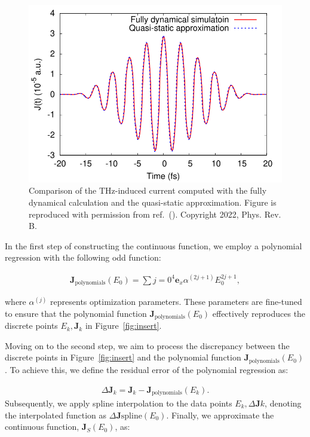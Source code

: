 \begin{figure}[htbp]
	\centering
	\includegraphics[width=0.8\linewidth]{pic/current_comparison_appendix.pdf}
	\caption{\label{fig:current} Comparison of the THz-induced current computed with the fully dynamical calculation and the quasi-static approximation. Figure is reproduced with permission from ref.~(\cite{PhysRevB.106.024313}). Copyright 2022, Phys. Rev. B.}
\end{figure}

In the first step of constructing the continuous function, we employ a polynomial regression with the following odd function:

\begin{align}
	\mathbf{J}_{\mathrm{polynomials }}(E_0)= \sum\limits{j=0}^{4} \mathbf e_x \alpha^{(2j+1)} E^{2j+1}_0,
	\label{eq:appendix-polynomial}
\end{align}

where $\alpha^{(j)}$ represents optimization parameters. These parameters are fine-tuned to ensure that the polynomial function $\mathbf{J}_{\mathrm{polynomials }}(E_0)$ effectively reproduces the discrete points ${E_k, \mathbf J_k}$ in Figure~\ref{fig:insert}.

Moving on to the second step, we aim to process the discrepancy between the discrete points in Figure~\ref{fig:insert} and the polynomial function $\mathbf{J}_{\mathrm{polynomials }}(E_0)$. To achieve this, we define the residual error of the polynomial regression as:

\begin{align}
	\Delta \mathbf{J}_k=\mathbf{J}_{k}-\mathbf{J}_{\mathrm{polynomials}}(E_k).
\end{align}
Subsequently, we apply spline interpolation to the data points ${E_k, \Delta \mathbf{J}k}$, denoting the interpolated function as $\Delta \mathbf{J}{\mathrm{spline}}(E_0)$. Finally, we approximate the continuous function, $\mathbf J_S(E_0)$, as:

